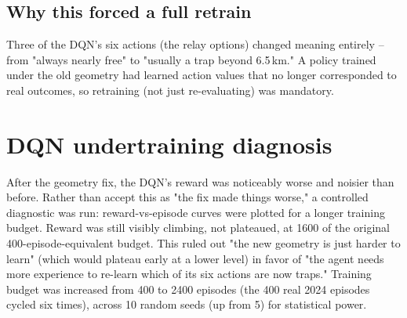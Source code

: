 \documentclass[11pt]{article}
\begin{document}
\begin{center}
\end{center}

\subsection{Why this forced a full retrain}
Three of the DQN's six actions (the relay options) changed meaning entirely -- from
"always nearly free" to "usually a trap beyond 6.5\,km." A policy trained under the old
geometry had learned action values that no longer corresponded to real outcomes, so
retraining (not just re-evaluating) was mandatory.

\section{DQN undertraining diagnosis}
After the geometry fix, the DQN's reward was noticeably worse and noisier than before.
Rather than accept this as "the fix made things worse," a controlled diagnostic was run:
reward-vs-episode curves were plotted for a longer training budget. Reward was still
visibly climbing, not plateaued, at 1600 of the original 400-episode-equivalent budget.
This ruled out "the new geometry is just harder to learn" (which would plateau early at
a lower level) in favor of "the agent needs more experience to re-learn which of its six
actions are now traps." Training budget was increased from 400 to 2400 episodes (the
400 real 2024 episodes cycled six times), across 10 random seeds (up from 5) for
statistical power.

\end{document}
